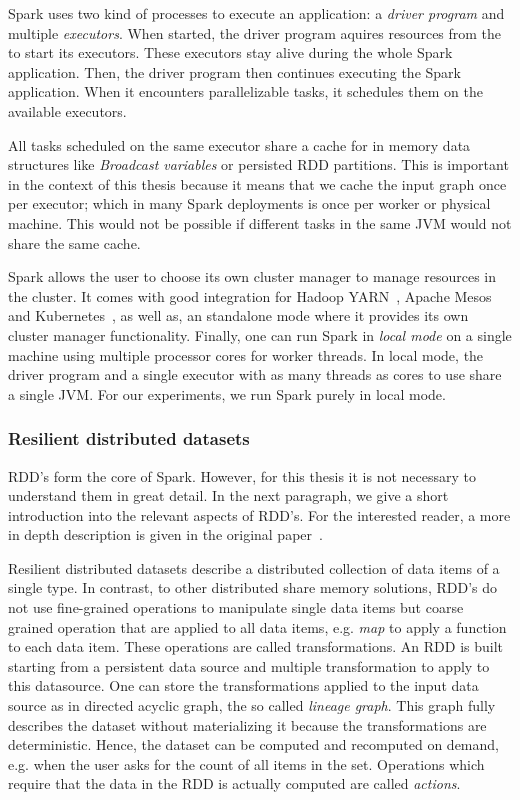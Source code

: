 Spark uses two kind of processes to execute an application: a \textit{driver program} and multiple \textit{executors}.
When started, the driver program aquires resources from the  to start its executors.
These executors stay alive during the whole Spark application.
Then, the driver program then continues executing the Spark application.
When it encounters parallelizable tasks, it schedules them on the available executors.

All tasks scheduled on the same executor share a cache for in memory data structures like \textit{Broadcast variables} or persisted RDD
partitions.
This is important in the context of this thesis because it means that we cache the input graph once per executor;
which in many Spark deployments is once per worker or physical machine.
This would not be possible if different tasks in the same JVM would not share the same cache.

Spark allows the user to choose its own cluster manager to manage resources in the cluster.
It comes with good integration for Hadoop YARN~\cite{yarn}, Apache Mesos~\cite{mesos} and Kubernetes~\cite{kubernetes}, as well as,
an standalone mode where it provides its own cluster manager functionality.
Finally, one can run Spark in \textit{local mode} on a single machine using multiple processor cores for worker threads.
In local mode, the driver program and a single executor with as many threads as cores to use share a single JVM.
For our experiments, we run Spark purely in local mode.

\subsubsection{Resilient distributed datasets}
RDD's form the core of Spark.
However, for this thesis it is not necessary to understand them in great detail.
In the next paragraph, we give a short introduction into the relevant aspects of RDD's.
For the interested reader, a more in depth description is given in the original paper~\cite{RDD}.

Resilient distributed datasets describe a distributed collection of data items of a single type.
In contrast, to other distributed share memory solutions, RDD's do not use fine-grained
operations to manipulate single data items but coarse grained operation that are applied
to all data items, e.g. \textit{map} to apply a function to each data item.
These operations are called transformations.
An RDD is built starting from a persistent data source and multiple transformation to
apply to this datasource.
One can store the transformations applied to the input data source as in directed acyclic graph, the so called \textit{lineage graph}.
This graph fully describes the dataset without materializing it because the transformations are deterministic.
Hence, the dataset can be computed and recomputed on demand, e.g. when the user asks for the count
of all items in the set.
Operations which require that the data in the RDD is actually computed are called \textit{actions}.

